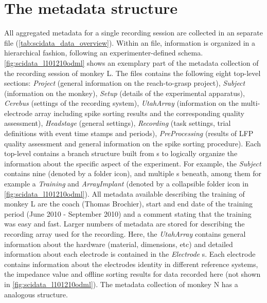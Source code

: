 \section{The metadata structure}
\label{sec:scidata_metadata_structure}
All aggregated metadata for a single recording session are collected in an separate  file (\cref{tab:scidata_data_overview}). Within an  file, information is organized in a hierarchical fashion, following an experimenter-defined schema. \cref{fig:scidata_l101210odml} shows an exemplary part of the metadata collection of the recording session of monkey L. The  files contains the following eight top-level sections: \textit{Project} (general information on the reach-to-grasp project), \textit{Subject} (information on the monkey), \textit{Setup} (details of the experimental apparatus), \textit{Cerebus} (settings of the recording system), \textit{UtahArray} (information on the multi-electrode array including spike sorting results and the corresponding quality assessment), \textit{Headstage} (general settings), \textit{Recording} (task settings, trial definitions with event time stamps and periods), \textit{PreProcessing} (results of LFP quality assessment and general information on the spike sorting procedure).
Each top-level  contains a branch structure built from s to logically organize the information about the specific aspect of the experiment. For example, the \textit{Subject}  contains nine  (denoted by a folder icon), and multiple s beneath, among them for example a  \textit{Training}  and \textit{ArrayImplant}  (denoted by a collapsible folder icon in \cref{fig:scidata_l101210odml}). All metadata available describing the training of monkey L are the coach (Thomas Brochier), start and end date of the training period (June 2010 - September 2010) and a comment stating that the training was easy and fast. Larger numbers of metadata are stored for describing the recording array used for the recording. Here, the  \textit{UtahArray} contains general information about the hardware (material, dimensions, etc) and detailed information about each electrode is contained in the \textit{Electrode} s. Each electrode  contains information about the electrodes identity in different reference systems, the impedance value and offline sorting results for data recorded here (not shown in \cref{fig:scidata_l101210odml}). The metadata collection of monkey N has a analogous structure.

